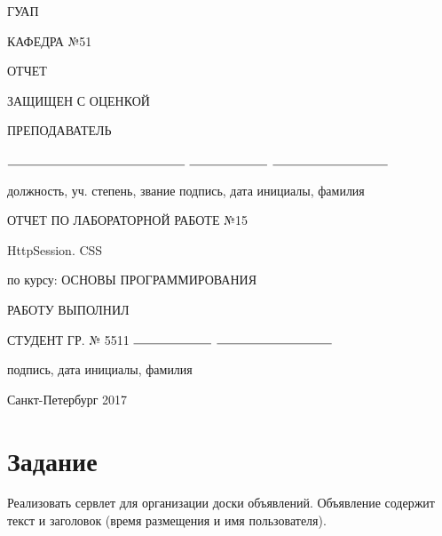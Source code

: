 \documentclass{article}
\begin{document}
\begin{titlepage}
	\begin{center}
    	ГУАП
    	\vspace{0.25cm}

    	КАФЕДРА №51
	\end{center}

    \begin{flushleft}

    	ОТЧЕТ

    	ЗАЩИЩЕН С ОЦЕНКОЙ

		ПРЕПОДАВАТЕЛЬ 


    	\vspace{0.5cm} 

		$\rule{5cm}{0.15mm}$ \hfill $\rule{2.2cm}{0.15mm}$  \hfill $\rule{3.25cm}{0.15mm}$

		должность, уч. степень, звание \hfill подпись, дата \hfill инициалы, фамилия
    \end{flushleft}
    
 	
    \hspace{2cm}

	\begin{center}
    	ОТЧЕТ ПО ЛАБОРАТОРНОЙ РАБОТЕ №15


    	\vspace{1cm}

    	HttpSession. CSS


    	\vspace{1cm}

    	по курсу: ОСНОВЫ ПРОГРАММИРОВАНИЯ {\MakeUppercase{}}
    \end{center}

    \vspace{3cm}

    \begin{flushleft}
    	РАБОТУ ВЫПОЛНИЛ

    	СТУДЕНТ ГР. № 5511 \hfill $\rule{2.2cm}{0.15mm}$  \hfill $\rule{3.25cm}{0.15mm}$

    	\hspace{7.8cm} подпись, дата \hfill инициалы, фамилия
    \end{flushleft}

	\vspace{5cm}   
	\begin{center}
 		Санкт-Петербург 2017
	\end{center}
\end{titlepage}

\section{Задание}
Реализовать сервлет для организации доски объявлений. Объявление содержит текст и заголовок (время размещения и имя пользователя).
\end{document}
